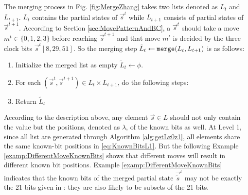 The merging process in Fig. \ref{fig:MergeZhang} takes two lists denoted as $L_t$ and $L_{t+1}$. 
$L_{t}$ contains the partial states of $\vec{ s}^t$ while $L_{t+1}$ consists of partial states of $\vec{s}^{t+1}$.
According to Section \ref{sec:MovePatternAndBC}, a $\vec{s}^t$ should take a move $m^t\in \{0,1,2,3\}$ before reaching $\vec{s}^{t+1}$ and that move $m^t$ is decided by the three clock bits $\vec{s}^t[8,29,51]$.
So the merging step $\tilde{L}_t\leftarrow {\tt merge}(L_t, L_{t+1})$ is as follows:
\begin{enumerate}
  \item Initialize the merged list as empty $\tilde{L}_t\leftarrow \phi$.
  \item For each $(\vec{s}^t,\vec{s}^{t+1})\in L_t\times L_{t+1}$, do the following steps:
  \item Return $\tilde{L}_t$
\end{enumerate}
According to the description above, any element $\vec{s}\in L$ should not only contain the value but the positions, denoted as $\lambda$, of the known bits as well.
At Level 1, since all list are generated through Algorithm \ref{alg:getLz0z1}, all elements share the same known-bit positions in \eqref{eq:KnownBitsL1}. 
But the following Example \ref{examp:DifferentMoveKnownBits} shows that different moves will result in different known bit positions.
Example \ref{examp:DifferentMoveKnownBits} indicates that the known bits of the merged partial state $\vec{\tilde{s}}^t$ may not be exactly the 21 bits given in \cite{AC:Zhang19}: they are also likely to be subsets of the 21 bits.
